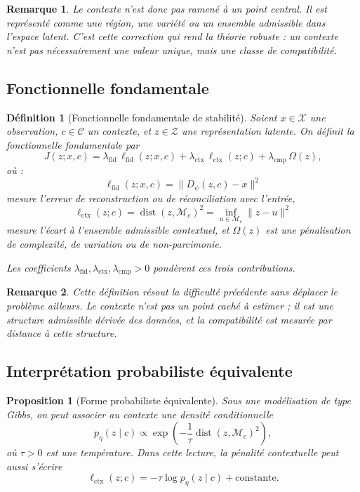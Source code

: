 \documentclass[11pt,a4paper]{article}
\newtheorem{definition}{Définition}[section]
\newtheorem{proposition}{Proposition}[section]
\newtheorem{remark}{Remarque}[section]
\DeclareMathOperator{\dist}{dist}
\newcommand{\X}{\mathcal X}
\newcommand{\C}{\mathcal C}
\newcommand{\Z}{\mathcal Z}
\newcommand{\1}{\mathbf 1}
\begin{document}
\begin{remark}
Le contexte n'est donc pas ramené à un point central.
Il est représenté comme une région, une variété ou un ensemble admissible dans l'espace latent.
C'est cette correction qui rend la théorie robuste : un contexte n'est pas nécessairement une valeur unique,
mais une classe de compatibilité.
\end{remark}

\subsection{Fonctionnelle fondamentale}

\begin{definition}[Fonctionnelle fondamentale de stabilité]
Soient \(x\in\X\) une observation, \(c\in\C\) un contexte, et \(z\in\Z\) une représentation latente.
On définit la fonctionnelle fondamentale par
\[
J(z;x,c)
=
\lambda_{\mathrm{fid}}\,\ell_{\mathrm{fid}}(z;x,c)
+
\lambda_{\mathrm{ctx}}\,\ell_{\mathrm{ctx}}(z;c)
+
\lambda_{\mathrm{cmp}}\,\Omega(z),
\]
où :
\[
\ell_{\mathrm{fid}}(z;x,c)
=
\|D_\psi(z,c)-x\|^2
\]
mesure l'erreur de reconstruction ou de réconciliation avec l'entrée,
\[
\ell_{\mathrm{ctx}}(z;c)
=
\dist(z,\mathcal M_c)^2
=
\inf_{u\in\mathcal M_c}\|z-u\|^2
\]
mesure l'écart à l'ensemble admissible contextuel,
et \(\Omega(z)\) est une pénalisation de complexité, de variation ou de non-parcimonie.

Les coefficients \(\lambda_{\mathrm{fid}},\lambda_{\mathrm{ctx}},\lambda_{\mathrm{cmp}}>0\) pondèrent ces trois contributions.
\end{definition}

\begin{remark}
Cette définition résout la difficulté précédente sans déplacer le problème ailleurs.
Le contexte n'est pas un point caché à estimer ; il est une structure admissible dérivée des données,
et la compatibilité est mesurée par distance à cette structure.
\end{remark}

\subsection{Interprétation probabiliste équivalente}

\begin{proposition}[Forme probabiliste équivalente]
Sous une modélisation de type Gibbs, on peut associer au contexte une densité conditionnelle
\[
p_\eta(z\mid c)\propto \exp\!\left(-\frac{1}{\tau}\dist(z,\mathcal M_c)^2\right),
\]
où \(\tau>0\) est une température.
Dans cette lecture, la pénalité contextuelle peut aussi s'écrire
\[
\ell_{\mathrm{ctx}}(z;c) = -\tau \log p_\eta(z\mid c) + \text{constante}.
\]
\end{proposition}
\end{document}
